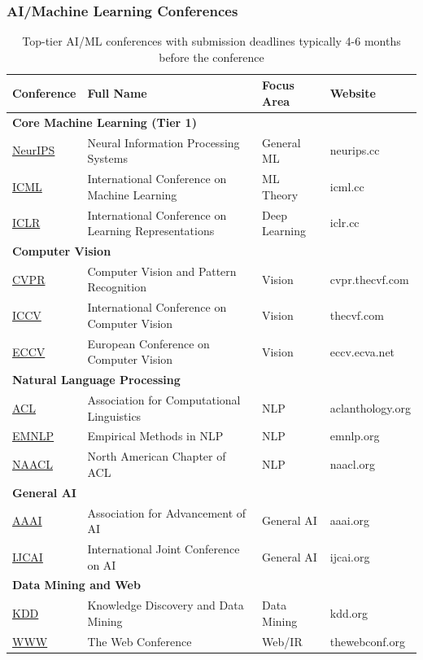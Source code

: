 \documentclass[11pt,a4paper]{article}
\begin{document}
\subsubsection{AI/Machine Learning Conferences}

\begin{table}[H]
\centering
\begin{tabular}{@{}llll@{}}
\toprule
\textbf{Conference} & \textbf{Full Name} & \textbf{Focus Area} & \textbf{Website} \\
\midrule
\multicolumn{4}{l}{\textbf{Core Machine Learning (Tier 1)}} \\
\href{https://neurips.cc/}{NeurIPS} & Neural Information Processing Systems & General ML & neurips.cc \\
\href{https://icml.cc/}{ICML} & International Conference on Machine Learning & ML Theory & icml.cc \\
\href{https://iclr.cc/}{ICLR} & International Conference on Learning Representations & Deep Learning & iclr.cc \\
\midrule
\multicolumn{4}{l}{\textbf{Computer Vision}} \\
\href{https://cvpr.thecvf.com/}{CVPR} & Computer Vision and Pattern Recognition & Vision & cvpr.thecvf.com \\
\href{https://iccv2023.thecvf.com/}{ICCV} & International Conference on Computer Vision & Vision & thecvf.com \\
\href{https://eccv.ecva.net/}{ECCV} & European Conference on Computer Vision & Vision & eccv.ecva.net \\
\midrule
\multicolumn{4}{l}{\textbf{Natural Language Processing}} \\
\href{https://aclanthology.org/}{ACL} & Association for Computational Linguistics & NLP & aclanthology.org \\
\href{https://2024.emnlp.org/}{EMNLP} & Empirical Methods in NLP & NLP & emnlp.org \\
\href{https://naacl.org/}{NAACL} & North American Chapter of ACL & NLP & naacl.org \\
\midrule
\multicolumn{4}{l}{\textbf{General AI}} \\
\href{https://aaai.org/}{AAAI} & Association for Advancement of AI & General AI & aaai.org \\
\href{https://ijcai.org/}{IJCAI} & International Joint Conference on AI & General AI & ijcai.org \\
\midrule
\multicolumn{4}{l}{\textbf{Data Mining and Web}} \\
\href{https://kdd.org/}{KDD} & Knowledge Discovery and Data Mining & Data Mining & kdd.org \\
\href{https://www2024.thewebconf.org/}{WWW} & The Web Conference & Web/IR & thewebconf.org \\
\bottomrule
\end{tabular}
\caption{Top-tier AI/ML conferences with submission deadlines typically 4-6 months before the conference}
\end{table}
\end{document}

